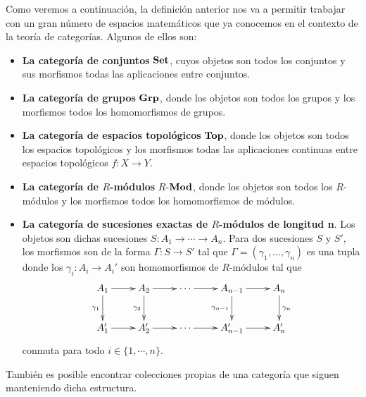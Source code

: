 \begin{ejemplo}
	Como veremos a continuación, la definición anterior nos va a permitir trabajar
	con un gran número de espacios matemáticos que ya conocemos en el contexto de
	la teoría de categorías. Algunos de ellos son:
	\begin{itemize}
		\item \textbf{La categoría de conjuntos} $\mathbf{Set}$, cuyos objetos son todos
		los conjuntos y sus morfismos todas las aplicaciones entre conjuntos.
		
		\item \textbf{La categoría de grupos} $\mathbf{Grp}$, donde los objetos son todos
		los grupos y los morfismos todos los homomorfismos de grupos.
		
		\item \textbf{La categoría de espacios topológicos} $\mathbf{Top}$, donde los objetos
		son todos los espacios topológicos y los morfismos todas las aplicaciones continuas
		entre espacios topológicos $f: X \rightarrow Y$.
		
		\item \textbf{La categoría de $R$-módulos} $R$-$\mathbf{Mod}$, donde los objetos
		son todos los $R$-módulos y los morfismos todos los homomorfismos de módulos.
		
		\item \textbf{La categoría de sucesiones exactas de $R$-módulos de longitud
			n}. Los objetos son dichas sucesiones $S: A_{1}\rightarrow \cdots \rightarrow
		A_{n}$. Para dos sucesiones $S$ y $S'$, los morfismos son de la forma $\Gamma
		: S \rightarrow S'$ tal que $\Gamma = (\gamma_{1}, \ldots, \gamma_{n})$ es
		una tupla donde los $\gamma_{i}: A_{i}\rightarrow A_{i}'$ son homomorfismos
		de $R$-módulos tal que
		\begin{equation}
			\label{exactseqcat}\xymatrix{ A_1 \ar[r] \ar[d]_{\gamma_1} & A_2 \ar[r] \ar[d]_{\gamma_2} & \cdots \ar[r] & A_{n-1} \ar[r] \ar[d]_{\gamma_{n-1}} & A_n \ar[d]^{\gamma_n} \\ A'_1 \ar[r] & A'_2 \ar[r] & \cdots \ar[r] & A'_{n-1} \ar[r] & A'_n }
		\end{equation}
		conmuta para todo $i \in \{ 1, \cdots, n \}$.
	\end{itemize}
\end{ejemplo}

También es posible encontrar colecciones propias de una categoría que siguen manteniendo
dicha estructura.


